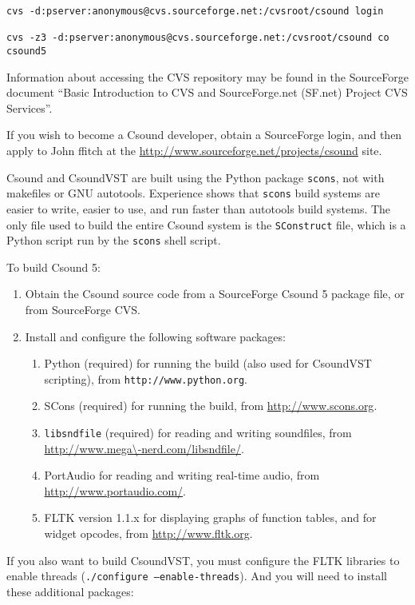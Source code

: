 \documentclass[10pt,letterpaper,onecolumn]{book}
\begin{document}
\begin{lstlisting}
cvs -d:pserver:anonymous@cvs.sourceforge.net:/cvsroot/csound login 
 
cvs -z3 -d:pserver:anonymous@cvs.sourceforge.net:/cvsroot/csound co csound5 
\end{lstlisting}

Information about accessing the CVS repository may be found in the SourceForge document ``Basic Introduction to CVS and SourceForge.net (SF.net) Project CVS Services''. 

If you wish to become a Csound developer, obtain a SourceForge login, and then apply to John ffitch at the \url{http://www.sourceforge.net/projects/csound} site.

Csound and CsoundVST are built using the Python package \texttt{scons}, not with makefiles or GNU autotools. Experience shows that \texttt{scons} build systems are easier to write, easier to use, and run faster than autotools build systems. The only file used to build the entire Csound system is the \texttt{SConstruct} file, which is a Python script run by the \texttt{scons} shell script.

To build Csound 5:
\begin{enumerate}
\item Obtain the Csound source code from a SourceForge Csound 5 package file, or from SourceForge CVS.
\item Install and configure the following software packages:
\begin{enumerate}
\item Python (required) for running the build (also used for CsoundVST scripting), from \texttt{http://www.python.org}.
\item SCons (required) for running the build, from \url{http://www.scons.org}.
\item \texttt{libsndfile} (required) for reading and writing soundfiles, from \url{http://www.mega\-nerd.com/libsndfile/}.
\item PortAudio for reading and writing real-time audio, from \url{http://www.portaudio.com/}.
\item FLTK version 1.1.x for displaying graphs of function tables, and for widget opcodes, from \url{http://www.fltk.org}.
\end{enumerate}
\end{enumerate}

If you also want to build CsoundVST, you must configure the FLTK libraries to enable threads (\texttt{./configure ---enable-threads}). And you will need to install these additional packages:
\end{document}
